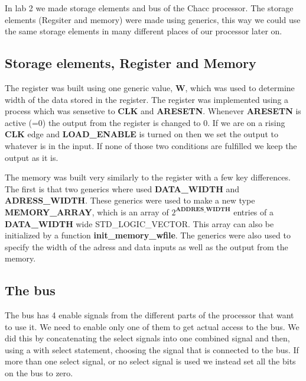 In lab 2 we made storage elements and bus of the Chacc processor. The storage
elements (Regsiter and memory) were made using generics, this way we could use
the same storage elements in many different places of our processor later on.
\subsection*{Storage elements, Register and Memory}
The register was built using one generic value, \textbf{W}, which was used to
determine width of the data stored in the register. The register was implemented
using a process which was sensetive to \textbf{CLK} and \textbf{ARESETN}.
Whenever \textbf{ARESETN} is active (=0) the output from the register is changed
to 0. If we are on a rising \textbf{CLK} edge and \textbf{LOAD\_ENABLE} is
turned on then we set the output to whatever is in the input. If none of those
two conditions are fulfilled we keep the output as it is.

The memory was built very similarly to the register with a few key differences.
The first is that two generics where used \textbf{DATA\_WIDTH} and
\textbf{ADRESS\_WIDTH}. These generics were used to make a new type
\textbf{MEMORY\_ARRAY}, which is an array of $2^{\textbf{ADDRES\_WIDTH}}$
entries of a \\ \textbf{DATA\_WIDTH} wide STD\_LOGIC\_VECTOR. This array can also
be initialized by a function \textbf{init\_memory\_wfile}. The generics were
also used to specify the width of the adress and data inputs as well as the
output from the memory.
\subsection*{The bus}
The bus has 4 enable signals from the different parts of the processor that want
to use it. We need to enable only one of them to get actual access to the bus.
We did this by concatenating the select signals into one combined signal and
then, using a with select statement, choosing the signal that is connected to
the bus. If more than one select signal, or no select signal is used we instead
set all the bits on the bus to zero.
